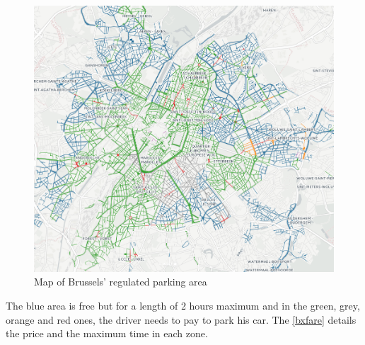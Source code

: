 \documentclass[12pt,a4paper,oneside]{book}
\begin{document}
\begin{figure}[h]
\centering
\caption{Map of Brussels' regulated parking area}
\label{bxmap}
\includegraphics[keepaspectratio=true,width=\textwidth-2cm]{images/bxpark.png}
\end{figure}


The blue area is free but for a length of 2 hours maximum and in the green, grey, orange and red ones, the driver needs to pay to park his car. The \autoref{bxfare} details the price and the maximum time in each zone.\\
\end{document}
